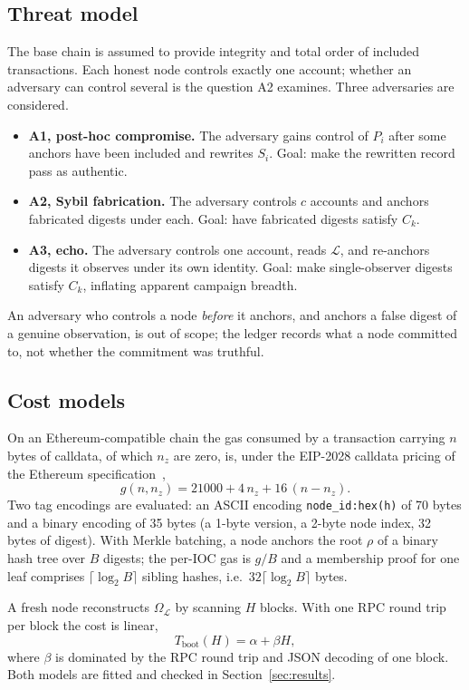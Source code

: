 \documentclass[conference]{IEEEtran}
\newcommand{\Ledger}{\mathcal{L}}
\newcommand{\Obs}{\Omega}
\begin{document}
\subsection{Threat model}
The base chain is assumed to provide integrity and total order of included transactions. Each honest node controls exactly one account; whether an adversary can control several is the question A2 examines. Three adversaries are considered.
\begin{itemize}
\item \textbf{A1, post-hoc compromise.} The adversary gains control of $P_i$ after some anchors have been included and rewrites $S_i$. Goal: make the rewritten record pass as authentic.
\item \textbf{A2, Sybil fabrication.} The adversary controls $c$ accounts and anchors fabricated digests under each. Goal: have fabricated digests satisfy $C_k$.
\item \textbf{A3, echo.} The adversary controls one account, reads $\Ledger$, and re-anchors digests it observes under its own identity. Goal: make single-observer digests satisfy $C_k$, inflating apparent campaign breadth.
\end{itemize}
An adversary who controls a node \emph{before} it anchors, and anchors a false digest of a genuine observation, is out of scope; the ledger records what a node committed to, not whether the commitment was truthful.

\subsection{Cost models}
\label{sec:cost}
On an Ethereum-compatible chain the gas consumed by a transaction carrying $n$ bytes of calldata, of which $n_z$ are zero, is, under the EIP-2028 calldata pricing of the Ethereum specification~\cite{ref18},
\begin{equation}
g(n,n_z)=21000+4\,n_z+16\,(n-n_z).
\label{eq:gas}
\end{equation}
Two tag encodings are evaluated: an ASCII encoding \texttt{node\_id:hex(h)} of 70 bytes and a binary encoding of 35 bytes (a 1-byte version, a 2-byte node index, 32 bytes of digest). With Merkle batching, a node anchors the root $\rho$ of a binary hash tree over $B$ digests; the per-IOC gas is $g/B$ and a membership proof for one leaf comprises $\lceil\log_2 B\rceil$ sibling hashes, i.e.\ $32\lceil\log_2 B\rceil$ bytes.

A fresh node reconstructs $\Obs_\Ledger$ by scanning $H$ blocks. With one RPC round trip per block the cost is linear,
\begin{equation}
T_{\mathrm{boot}}(H)=\alpha+\beta H,
\label{eq:boot}
\end{equation}
where $\beta$ is dominated by the RPC round trip and JSON decoding of one block. Both models are fitted and checked in Section~\ref{sec:results}.
\end{document}
